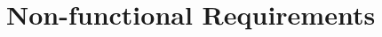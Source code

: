 \documentclass[11pt]{article} %
\begin{document}
\begin{enumerate}[{VP}1.]
\end{enumerate}


\section{Non-functional Requirements}







\end{document}
